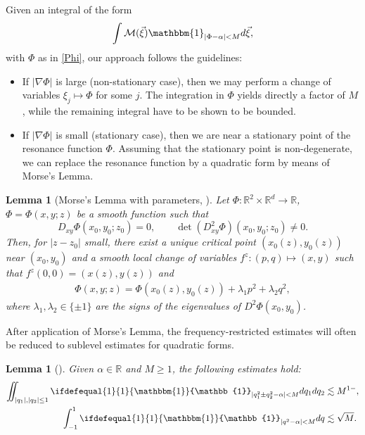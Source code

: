 \documentclass[a4paper,
11pt,  reqno]{amsart}
\newcommand{\5}{\textup{V}}
\newcommand{\m}[1]{
	\ifdefequal{#1}{1}
	{\mathbbm{#1}}
	{\mathbb{#1}}
}
\newtheorem{lemma}[theorem]{Lemma}
\theoremstyle{remark}
\newcommand{\R}{\mathbb{R}}
\newcommand{\ld}{\lambda}
\numberwithin{equation}{section}
\numberwithin{theorem}{section}
\begin{document}
Given an integral of the form
$$
\int \mathcal{M}(\vec\xi)\mathbbm{1}_{|\Phi-\alpha|<M}d\vec{\xi},
$$
with $\Phi$ as in \eqref{Phi},
our approach follows the guidelines:
\begin{itemize}
\item If $|\nabla \Phi|$ is large (non-stationary case), then we may perform a change of variables $\xi_j\mapsto \Phi$ for some $j$. The integration in $\Phi$ yields directly a factor of $M$, while the remaining integral have to be shown to be bounded.
\item If $|\nabla \Phi|$ is small (stationary case), then we are near a stationary point of the resonance function $\Phi$. Assuming that the stationary point is non-degenerate, we can replace the resonance function by a quadratic form by means of Morse's Lemma.

\end{itemize}

		
		\begin{lemma}[Morse's Lemma with parameters, {\cite[Lemma C.6.1]{Hormander}}]
			\label{LEM:morse}
		Let $\Phi: \R^2\times \R^d \to \R$, $\Phi=\Phi(x,y;z)$ be a smooth function such that 
        $$D_{xy} \Phi(x_0,y_0;z_0) = 0,\qquad\det(D^2_{xy} \Phi)(x_0,y_0;z_0) \ne 0.$$
Then, for $|z-z_0|$ small, there exist a unique critical point $(x_0(z),y_0(z))$ near $(x_0,y_0)$ and  a smooth local change of variables $f^z: (p,q) \mapsto (x,y) $ such that $f^z(0,0) = (x(z),y(z))$ and 
\begin{align}
\Phi(x,y;z) = \Phi(x_0(z), y_0(z)) + \ld_1 p^2 + \ld_2 q^2, 
\end{align}
where $\ld_1,\ld_2 \in \{\pm1\}$ are the signs of the eigenvalues of $D^2\Phi(x_0,y_0)$. 
		\end{lemma}
		



       After application of Morse's Lemma, the frequency-restricted estimates will often be reduced to sublevel estimates for quadratic forms.

         
		\begin{lemma}[{\cite[Lemma 5]{COS}}]
        \label{lem:quadraticas}
			Given $\alpha\in \R$ and $M\ge 1$, the following estimates hold:
			\begin{align}
            \label{eq:posdef}
				\iint_{|q_1|, |q_2|\le 1} \m 1_{|q_1^2\pm q_2^2-\alpha|<M}dq_1dq_2 &\lesssim M^{1-}, \\
                \label{eq:quadratica}
				\int_{-1}^{1} \m 1_{|q^2  -\alpha | < M} dq 
                &\lesssim \sqrt M
                . 
			\end{align}

		\end{lemma}
\end{document}
